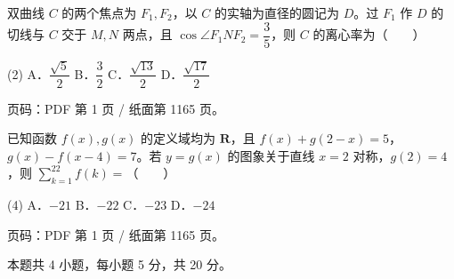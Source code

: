 \begin{question}
双曲线 $C$ 的两个焦点为 $F_1,F_2$，以 $C$ 的实轴为直径的圆记为 $D$。过 $F_1$ 作 $D$ 的切线与 $C$ 交于 $M,N$ 两点，且 $\cos\angle F_1NF_2=\dfrac35$，则 $C$ 的离心率为\mbox{（　　）}

\begin{gkopts}(2)
\task A．$\dfrac{\sqrt5}{2}$
\task B．$\dfrac32$
\task C．$\dfrac{\sqrt{13}}2$
\task D．$\dfrac{\sqrt{17}}2$
\end{gkopts}

\begin{gktip}
页码：PDF 第 1 页 / 纸面第 1165 页。
\end{gktip}

\end{question}
\begin{question}
已知函数 $f(x),g(x)$ 的定义域均为 $\mathbf R$，且 $f(x)+g(2-x)=5$，$g(x)-f(x-4)=7$。若 $y=g(x)$ 的图象关于直线 $x=2$ 对称，$g(2)=4$，则 $\displaystyle\sum_{k=1}^{22}f(k)=$\mbox{（　　）}

\begin{gkopts}(4)
\task A．$-21$
\task B．$-22$
\task C．$-23$
\task D．$-24$
\end{gkopts}

\begin{gktip}
页码：PDF 第 1 页 / 纸面第 1165 页。
\end{gktip}

\end{question}

\begin{gktip}
本题共 4 小题，每小题 5 分，共 20 分。
\end{gktip}

